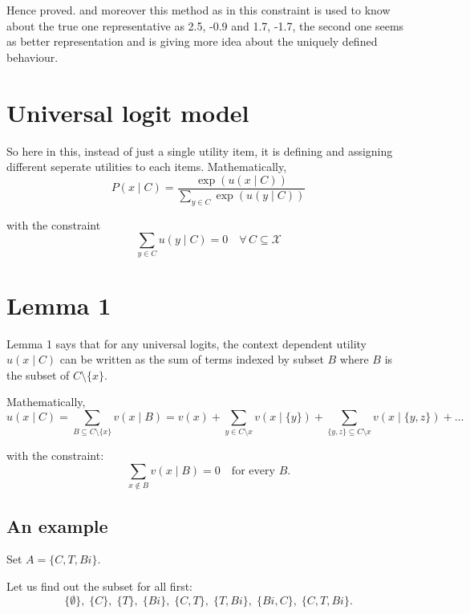 \documentclass{article}
\begin{document}
Hence proved. and moreover this method as in this constraint is used to know about the true one representative as 
2.5, -0.9 and 1.7, -1.7, the second one seems as better representation and is giving more idea about the uniquely defined behaviour.

\section{Universal logit model}
So here in this, instead of just a single utility item, it is defining and assigning different seperate utilities to each items. Mathematically, 
\begin{equation*}
    P(x \mid C) = \frac{\exp(u(x \mid C))}{\displaystyle\sum_{y \in C} \exp(u(y \mid C))}
\end{equation*}

with the constraint
\begin{equation*}
    \sum_{y \in C} u(y \mid C) = 0 \quad \forall\, C \subseteq \mathcal{X}
\end{equation*}

\section{Lemma 1}

Lemma 1 says that for any universal logits, the context dependent
utility $u(x \mid C)$ can be written as the sum of terms indexed by
subset $B$ where $B$ is the subset of $C \setminus \{x\}$. \cite{seshadri2019}

Mathematically,
\begin{equation*}
    u(x \mid C) = \sum_{B \subseteq C \setminus \{x\}} v(x \mid B)
    = v(x) + \sum_{y \in C \setminus x} v(x \mid \{y\})
    + \sum_{\{y, z\} \subseteq C \setminus x} v(x \mid \{y, z\}) + \dots
\end{equation*}

with the constraint:
\begin{equation*}
    \sum_{x \notin B} v(x \mid B) = 0 \quad \text{for every } B.
\end{equation*}

\subsection*{An example}

Set $A = \{C, T, Bi\}$.

Let us find out the subset for all first:
\begin{equation*}
    \{\emptyset\}, \; \{C\}, \; \{T\}, \; \{Bi\}, \; \{C, T\}, \;
    \{T, Bi\}, \; \{Bi, C\}, \; \{C, T, Bi\}.
\end{equation*}
\end{document}
